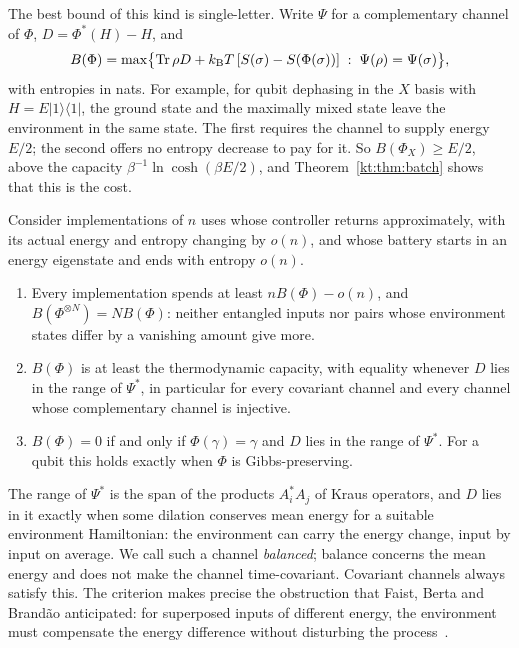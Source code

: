 The best bound of this kind is single-letter. Write $\Psi$ for a complementary channel of $\Phi$, $D=\Phi^*(H)-H$, and
\[
B(\Phi)=\max\bigl\{\operatorname{Tr}\rho D+k_{\mathrm B} T\,[S(\sigma)-S(\Phi(\sigma))]\;:\;\Psi(\rho)=\Psi(\sigma)\bigr\},
\]
with entropies in nats. For example, for qubit dephasing in the $X$ basis with $H=E|1\rangle\langle1|$, the ground state and the maximally mixed state leave the environment in the same state. The first requires the channel to supply energy $E/2$; the second offers no entropy decrease to pay for it. So $B(\Phi_X)\ge E/2$, above the capacity $\beta^{-1}\ln\cosh(\beta E/2)$, and Theorem~\ref{kt:thm:batch} shows that this is the cost.

\begin{proposition}\label{kt:prop:single}
Consider implementations of $n$ uses whose controller returns approximately, with its actual energy and entropy changing by $o(n)$, and whose battery starts in an energy eigenstate and ends with entropy $o(n)$.
\begin{enumerate}[label=(\alph*)]
\item Every implementation spends at least $nB(\Phi)-o(n)$, and $B(\Phi^{\otimes N})=NB(\Phi)$: neither entangled inputs nor pairs whose environment states differ by a vanishing amount give more.
\item $B(\Phi)$ is at least the thermodynamic capacity, with equality whenever $D$ lies in the range of $\Psi^*$, in particular for every covariant channel and every channel whose complementary channel is injective.
\item $B(\Phi)=0$ if and only if $\Phi(\gamma)=\gamma$ and $D$ lies in the range of $\Psi^*$. For a qubit this holds exactly when $\Phi$ is Gibbs-preserving.
\end{enumerate}
\end{proposition}

The range of $\Psi^*$ is the span of the products $A_i^*A_j$ of Kraus operators, and $D$ lies in it exactly when some dilation conserves mean energy for a suitable environment Hamiltonian: the environment can carry the energy change, input by input on average. We call such a channel \emph{balanced}; balance concerns the mean energy and does not make the channel time-covariant. Covariant channels always satisfy this. The criterion makes precise the obstruction that Faist, Berta and Brand\~ao anticipated: for superposed inputs of different energy, the environment must compensate the energy difference without disturbing the process~\cite{FBB19}.

